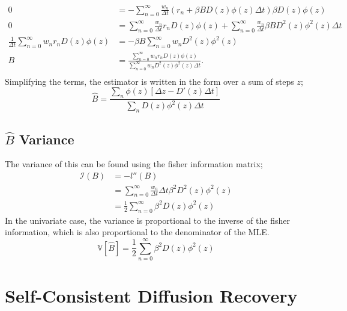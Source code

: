 \begin{align*}
    0 &= -\sum_{n=0}^\infty\frac{w_n}{\Delta t} \left(r_n  + \beta B D(z)\phi(z)\Delta t\right)\beta D(z) \phi(z) \\
   0 &= \sum_{n=0}^\infty\frac{w_n}{\Delta t} r_n D(z) \phi(z) + \sum_{n=0}^{\infty}\frac{w_n}{\Delta t} \beta B D^2(z)\phi^2(z)\Delta t \\
    \frac{1}{\Delta t}\sum_{n=0}^\infty w_n r_n D(z) \phi(z)&= -\beta B\sum_{n=0}^{\infty}w_n D^2(z)\phi^2(z) \\
    B &=\frac{\sum_{n=0}^\infty w_n r_n D(z) \phi(z)}{\sum_{n=0}^{\infty}w_n D^2(z)\phi^2(z) \Delta t}. \\
\end{align*}
Simplifying the terms, the estimator is written in the form over a sum of steps $z$;
\begin{equation}
    \hat B = \frac{\sum_n \phi(z)\left[\Delta z - D'(z)\Delta t\right]}{\sum_n D(z)\phi^2(z)\Delta t}
\end{equation}

\section{$\hat{B}$ Variance}

The variance of this can be found using the fisher information matrix;
\begin{align*}
    \mathcal{I}(B) &= -l''(B) \\
            &= \sum_{n=0}^\infty \frac{w_n}{\Delta t} \Delta t \beta^2 D^2(z)\phi^2(z)\\
            &= \frac{1}{2}\sum_{n=0}^\infty \beta^2 D(z)\phi^2(z)
\end{align*}
In the univariate case, the variance is proportional to the inverse of the fisher information, which is also proportional to the denominator of the MLE. 
\begin{equation}
    \mathbb{V}[\hat{B}] = \frac{1}{2}\sum_{n=0}^\infty \beta^2 D(z)\phi^2(z)
\end{equation}


\clearpage
\chapter{Self-Consistent Diffusion Recovery}
\label{app:3}

